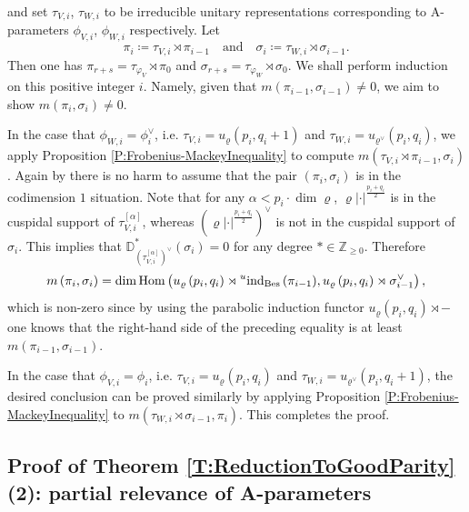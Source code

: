 \documentclass[11pt,letterpaper]{amsart}
\theoremstyle{plain}
\newcounter{theorem}[section]
\numberwithin{theorem}{section}
\numberwithin{equation}{subsection}
\theoremstyle{remark}
\newcommand{\Hom}{\operatorname{Hom}}
\newcommand{\ind}{\operatorname{ind}}
\newcommand{\Bes}{\operatorname{Bes}} %
\newcommand{\D}{\mathbb{D}}
\newcommand{\Z}{\mathbb{Z}}
\begin{document}
and set $\tau_{V,i}$, $\tau_{W,i}$ to be irreducible unitary representations corresponding to A-parameters $\phi_{V,i}$, $\phi_{W,i}$ respectively. Let
\[
    \pi_i\coloneqq \tau_{V,i}\rtimes \pi_{i-1} \quad \text{and} \quad \sigma_i\coloneqq \tau_{W,i}\rtimes \sigma_{i-1}.
\]
Then one has $\pi_{r+s} = \tau_{\varphi_V}\rtimes\pi_0$ and $\sigma_{r+s}=\tau_{\varphi_W}\rtimes \sigma_0$. We shall perform induction on this positive integer $i$. Namely, given that $m\left(\pi_{i-1},\sigma_{i-1}\right)\neq 0$, we aim to show $m\left(\pi_{i},\sigma_{i}\right)\neq 0$.

\vskip 5pt

In the case that $\phi_{W,i} = \phi_i^\vee$, i.e. $\tau_{V,i}=u_{\varrho}\left(p_i,q_i+1\right)$ and $\tau_{W,i}=u_{\varrho^\vee}\left(p_i,q_i\right)$, we apply Proposition \ref{P:Frobenius-MackeyInequality} to compute $m\left(\tau_{V,i}\rtimes \pi_{i-1},\sigma_i\right)$. Again by \cite[Thm. 15.1]{MR3202556} there is no harm to assume that the pair $\left(\pi_i,\sigma_i\right)$ is in the codimension $1$ situation. Note that for any $\alpha<p_i\cdot \dim \varrho$, $\varrho|\cdot|^{\frac{p_i+q_i}{2}}$ is in the cuspidal support of $\tau_{V,i}^{[\alpha]}$, whereas $\left(\varrho|\cdot|^{\frac{p_i+q_i}{2}}\right)^\vee$ is not in the cuspidal support of $\sigma_i$. This implies that $\D^*_{\left(\tau_{V,i}^{[\alpha]}\right)^\vee}\left(\sigma_i\right) = 0$ for any degree $*\in\Z_{\geq0}$. Therefore
\[
    m\left(\pi_i,\sigma_i\right) = \dim \Hom\left(u_{\varrho}\left(p_i,q_i\right)\rtimes{\prescript{u}{}{\ind}_{\Bes}\left(\pi_{i-1}\right)}, u_{\varrho}\left(p_i,q_i\right)\rtimes \sigma_{i-1}^\vee\right),
\]
which is non-zero since by using the parabolic induction functor $u_{\varrho}\left(p_i,q_i\right)\rtimes-$ one knows that the right-hand side of the preceding equality is at least $m\left(\pi_{i-1},\sigma_{i-1}\right)$.

\vskip 5pt

In the case that $\phi_{V,i} = \phi_i$, i.e. $\tau_{V,i}=u_{\varrho}\left(p_i,q_i\right)$ and $\tau_{W,i}=u_{\varrho^\vee}\left(p_i,q_i+1\right)$, the desired conclusion can be proved similarly by applying Proposition \ref{P:Frobenius-MackeyInequality} to $m\left(\tau_{W,i}\rtimes \sigma_{i-1},\pi_i\right)$. This completes the proof.


\subsection{Proof of Theorem \ref{T:ReductionToGoodParity}(2): partial relevance of A-parameters} %
\label{sub:proof_of_theorem_t:reductiontogoodparity_the_only_if_part}
\end{document}
